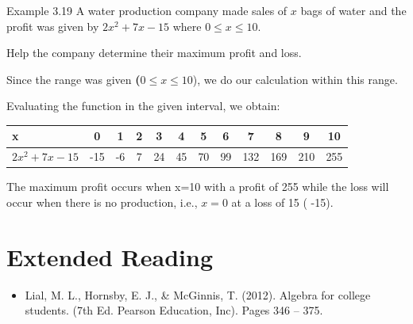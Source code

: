 \begin{example}{Example 3.19}
A water production company made sales of $x$ bags of water and the profit was
given by $2x^2 + 7x - 15$ where $0 \le x \le 10$.

Help the company determine their maximum profit and loss.

\solution
Since the range was given \textbf{(}$0 \le x \le 10$), we do our calculation within
this range.

Evaluating the function in the given interval, we obtain:
\begin{center}
\renewcommand{\arraystretch}{1.3}
\begin{tabular}{|l|c|c|c|c|c|c|c|c|c|c|c|}
\hline
x & 0 & 1 & 2 & 3 & 4 & 5 & 6 & 7 & 8 & 9 & 10 \\
\hline
$2x^2 + 7x - 15$ & -15 & -6 & 7 & 24 & 45 & 70 & 99 & 132 & 169 & 210 & 255 \\
\hline
\end{tabular}
\end{center}
The maximum profit occurs when x=10 with a profit of 255 while the loss will
occur when there is no production, i.e., $x = 0$ at a loss of 15 ( -15).
\end{example}

\section*{Extended Reading}
\begin{itemize}
  \item Lial, M. L., Hornsby, E. J., \& McGinnis, T. (2012). Algebra for college
  students. (7th Ed. Pearson Education, Inc). Pages 346 -- 375.
\end{itemize}
